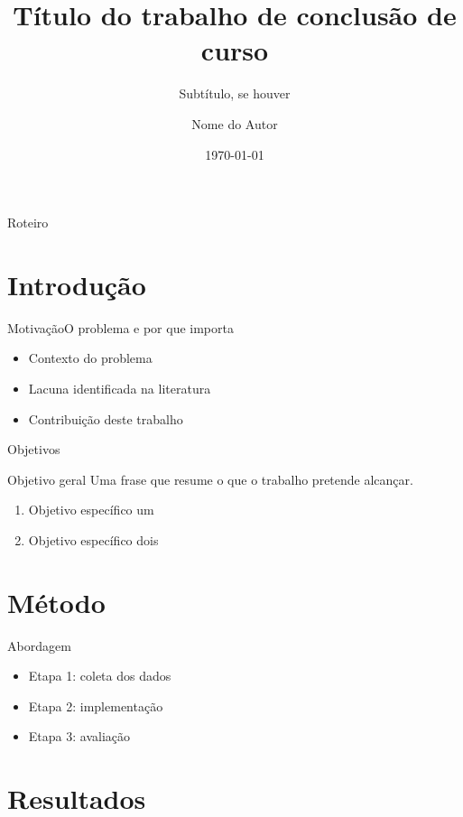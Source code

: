 \documentclass[aspectratio=169,10pt]{beamer}
\title[Título curto]{Título do trabalho de conclusão de curso}
\subtitle{Subtítulo, se houver}
\author[Nome do Autor]{Nome do Autor}
\date{\today}
\begin{document}
\maketitle

\begin{frame}{Roteiro}
  \tableofcontents
\end{frame}

\section{Introdução}

\begin{frame}{Motivação}{O problema e por que importa}
  \begin{itemize}
    \item Contexto do problema
    \item Lacuna identificada na literatura
    \item Contribuição deste trabalho
  \end{itemize}
\end{frame}

\begin{frame}{Objetivos}
  \begin{block}{Objetivo geral}
    Uma frase que resume o que o trabalho pretende alcançar.
  \end{block}
  \begin{enumerate}
    \item Objetivo específico um
    \item Objetivo específico dois
  \end{enumerate}
\end{frame}

\section{Método}

\begin{frame}{Abordagem}
  \begin{itemize}
    \item Etapa 1: \alert{coleta} dos dados
    \item Etapa 2: implementação
    \item Etapa 3: avaliação
  \end{itemize}
\end{frame}

\section{Resultados}
\end{document}
